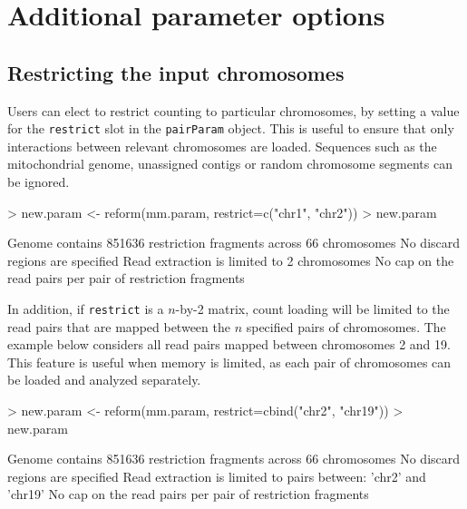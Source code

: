 \documentclass[12pt]{report}
\renewenvironment{Schunk}{\vspace{0pt}}{\vspace{0pt}}
\newcommand{\code}[1]{{\small\texttt{#1}}}
\begin{document}
\section{Additional parameter options}

\subsection{Restricting the input chromosomes}
\label{sec:restrictchr}

Users can elect to restrict counting to particular chromosomes, by setting a value for the \code{restrict} slot in the \code{pairParam} object.
This is useful to ensure that only interactions between relevant chromosomes are loaded.
Sequences such as the mitochondrial genome, unassigned contigs or random chromosome segments can be ignored.

\begin{Schunk}
\begin{Sinput}
> new.param <- reform(mm.param, restrict=c("chr1", "chr2"))
> new.param
\end{Sinput}
\begin{Soutput}
Genome contains 851636 restriction fragments across 66 chromosomes
No discard regions are specified
Read extraction is limited to 2 chromosomes
No cap on the read pairs per pair of restriction fragments
\end{Soutput}
\end{Schunk}

In addition, if \code{restrict} is a $n$-by-2 matrix, count loading will be limited to the read pairs that are mapped between the $n$ specified pairs of chromosomes.
The example below considers all read pairs mapped between chromosomes 2 and 19.
This feature is useful when memory is limited, as each pair of chromosomes can be loaded and analyzed separately.

\begin{Schunk}
\begin{Sinput}
> new.param <- reform(mm.param, restrict=cbind("chr2", "chr19"))
> new.param
\end{Sinput}
\begin{Soutput}
Genome contains 851636 restriction fragments across 66 chromosomes
No discard regions are specified
Read extraction is limited to pairs between:
	'chr2' and 'chr19'
No cap on the read pairs per pair of restriction fragments
\end{Soutput}
\end{Schunk}
\end{document}
